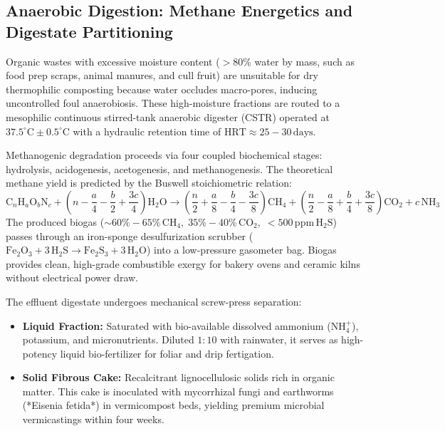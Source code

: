 \subsection{Anaerobic Digestion: Methane Energetics and Digestate Partitioning}
Organic wastes with excessive moisture content ($>80\%$ water by mass, such as food prep scraps, animal manures, and cull fruit) are unsuitable for dry thermophilic composting because water occludes macro-pores, inducing uncontrolled foul anaerobiosis. These high-moisture fractions are routed to a mesophilic continuous stirred-tank anaerobic digester (CSTR) operated at $37.5^\circ\mathrm{C} \pm 0.5^\circ\mathrm{C}$ with a hydraulic retention time of $\mathrm{HRT} \approx 25 - 30\,\mathrm{days}$.

Methanogenic degradation proceeds via four coupled biochemical stages: hydrolysis, acidogenesis, acetogenesis, and methanogenesis. The theoretical methane yield is predicted by the Buswell stoichiometric relation:
\begin{equation}
\mathrm{C}_n \mathrm{H}_a \mathrm{O}_b \mathrm{N}_c + \left( n - \frac{a}{4} - \frac{b}{2} + \frac{3c}{4} \right) \mathrm{H}_2\mathrm{O} \to \left( \frac{n}{2} + \frac{a}{8} - \frac{b}{4} - \frac{3c}{8} \right) \mathrm{CH}_4 + \left( \frac{n}{2} - \frac{a}{8} + \frac{b}{4} + \frac{3c}{8} \right) \mathrm{CO}_2 + c \, \mathrm{NH}_3
\label{eq:buswell_methane}
\end{equation}
The produced biogas ($\sim 60\% - 65\%\,\mathrm{CH}_4, \; 35\% - 40\%\,\mathrm{CO}_2, \; <500\,\mathrm{ppm}\,\mathrm{H}_2\mathrm{S}$) passes through an iron-sponge desulfurization scrubber ($\mathrm{Fe}_2\mathrm{O}_3 + 3\,\mathrm{H}_2\mathrm{S} \to \mathrm{Fe}_2\mathrm{S}_3 + 3\,\mathrm{H}_2\mathrm{O}$) into a low-pressure gasometer bag. Biogas provides clean, high-grade combustible exergy for bakery ovens and ceramic kilns without electrical power draw.

The effluent digestate undergoes mechanical screw-press separation:
\begin{itemize}
    \item \textbf{Liquid Fraction:} Saturated with bio-available dissolved ammonium ($\mathrm{NH}_4^+$), potassium, and micronutrients. Diluted $1:10$ with rainwater, it serves as high-potency liquid bio-fertilizer for foliar and drip fertigation.
    \item \textbf{Solid Fibrous Cake:} Recalcitrant lignocellulosic solids rich in organic matter. This cake is inoculated with mycorrhizal fungi and earthworms (*Eisenia fetida*) in vermicompost beds, yielding premium microbial vermicastings within four weeks.
\end{itemize}

